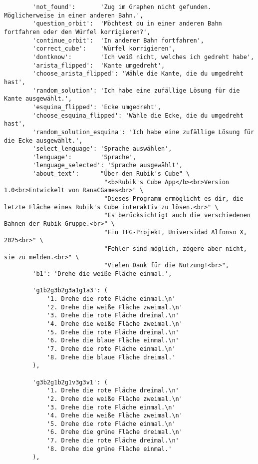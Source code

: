 \begin{lstlisting}
        'not_found':       'Zug im Graphen nicht gefunden. Möglicherweise in einer anderen Bahn.',
        'question_orbit':  'Möchtest du in einer anderen Bahn fortfahren oder den Würfel korrigieren?',
        'continue_orbit':  'In anderer Bahn fortfahren',
        'correct_cube':    'Würfel korrigieren',
        'dontknow':        'Ich weiß nicht, welches ich gedreht habe',
        'arista_flipped':  'Kante umgedreht',
        'choose_arista_flipped': 'Wähle die Kante, die du umgedreht hast',
        'random_solution': 'Ich habe eine zufällige Lösung für die Kante ausgewählt.',
        'esquina_flipped': 'Ecke umgedreht',
        'choose_esquina_flipped': 'Wähle die Ecke, die du umgedreht hast',
        'random_solution_esquina': 'Ich habe eine zufällige Lösung für die Ecke ausgewählt.',
        'select_lenguage': 'Sprache auswählen',
        'lenguage':        'Sprache',
        'lenguage_selected': 'Sprache ausgewählt',
        'about_text':      "Über den Rubik's Cube" \
                            "<b>Rubik's Cube App</b><br>Version 1.0<br>Entwickelt von RanaCGames<br>" \
                            "Dieses Programm ermöglicht es dir, die letzte Fläche eines Rubik's Cube interaktiv zu lösen.<br>" \
                            "Es berücksichtigt auch die verschiedenen Bahnen der Rubik-Gruppe.<br>" \
                            "Ein TFG-Projekt, Universidad Alfonso X, 2025<br>" \
                            "Fehler sind möglich, zögere aber nicht, sie zu melden.<br>" \
                            "Vielen Dank für die Nutzung!<br>",
        'b1': 'Drehe die weiße Fläche einmal.',

        'g1b2g3b2g3a1g1a3': (
            '1. Drehe die rote Fläche einmal.\n'
            '2. Drehe die weiße Fläche zweimal.\n'
            '3. Drehe die rote Fläche dreimal.\n'
            '4. Drehe die weiße Fläche zweimal.\n'
            '5. Drehe die rote Fläche dreimal.\n'
            '6. Drehe die blaue Fläche einmal.\n'
            '7. Drehe die rote Fläche einmal.\n'
            '8. Drehe die blaue Fläche dreimal.'
        ),

        'g3b2g1b2g1v3g3v1': (
            '1. Drehe die rote Fläche dreimal.\n'
            '2. Drehe die weiße Fläche zweimal.\n'
            '3. Drehe die rote Fläche einmal.\n'
            '4. Drehe die weiße Fläche zweimal.\n'
            '5. Drehe die rote Fläche einmal.\n'
            '6. Drehe die grüne Fläche dreimal.\n'
            '7. Drehe die rote Fläche dreimal.\n'
            '8. Drehe die grüne Fläche einmal.'
        ),


\end{lstlisting}
